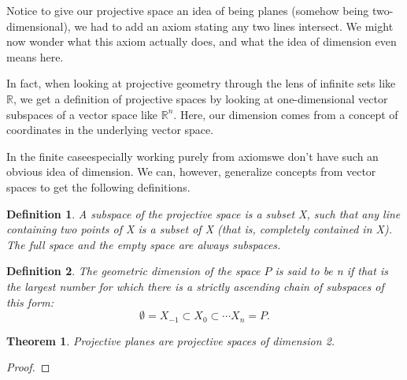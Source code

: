 \documentclass[12pt]{article}
\newtheorem{theorem}{Theorem}
\newtheorem{definition}{Definition}
\begin{document}

    Notice to give our projective space an idea of being planes (somehow being two-dimensional), we had to add an axiom stating any two lines intersect.
    We might now wonder what this axiom actually does, and what the idea of dimension even means here.

    In fact, when looking at projective geometry through the lens of infinite sets like $\mathbb{R}$,
    we get a definition of projective spaces by looking at one-dimensional vector subspaces of a vector space like $\mathbb{R}^n$.\cite{weisstein_projective_nodate}
    Here, our dimension comes from a concept of coordinates in the underlying vector space.

    In the finite case\textemdash especially working purely from axioms\textemdash we don't have such an obvious idea of dimension.
    We can, however, generalize concepts from vector spaces to get the following definitions.\cite{noauthor_projective_2024,beutelspacher_projective_2000}

    \begin{definition}
        A subspace of the projective space is a subset X, such that any line containing two points of X is a subset of X (that is, completely contained in X).
        The full space and the empty space are always subspaces.
    \end{definition}

    \begin{definition}
        The geometric dimension of the space $P$ is said to be n if that is the largest number for which there is a strictly ascending chain of subspaces of this form:
        \[\emptyset = X_{-1}\subset X_{0}\subset \cdots X_{n}=P.\]
    \end{definition}

    \begin{theorem}
        Projective planes are projective spaces of dimension 2.
    \end{theorem}

    \begin{proof}
    \end{proof}

\end{document}
